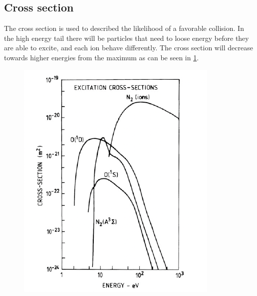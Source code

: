 \subsection{Cross section}
The cross section is used to described the likelihood of a favorable collision. In the high energy tail there will be particles that need to loose energy before they are able to excite, and each ion behave differently. The cross section will decrease towards higher energies from the maximum as can be seen in \cref{fig:L4_cross_section}.
\begin{figure}[t]
    \centering
    \includegraphics[width=.6\linewidth]{bilder/L4_cross_section.png}
    \caption{}\label{fig:L4_cross_section}
\end{figure}

